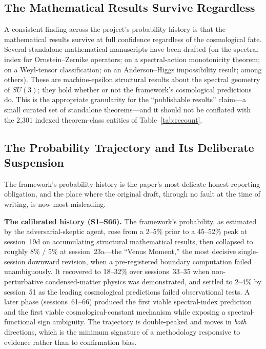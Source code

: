 \documentclass[12pt,a4paper]{article}
\begin{document}
\subsection{The Mathematical Results Survive Regardless}
\label{sec:math-survive}

A consistent finding across the project's probability history is that the mathematical results survive at full confidence regardless of the cosmological fate. Several standalone mathematical manuscripts have been drafted (on the spectral index for Ornstein--Zernike operators; on a spectral-action monotonicity theorem; on a Weyl-tensor classification; on an Anderson--Higgs impossibility result; among others). These are machine-epsilon structural results about the spectral geometry of $SU(3)$; they hold whether or not the framework's cosmological predictions do. This is the appropriate granularity for the ``publishable results'' claim---a small curated set of standalone theorems---and it should not be conflated with the 2{,}301 indexed theorem-class entities of Table~\ref{tab:recount}.

\subsection{The Probability Trajectory and Its Deliberate Suspension}
\label{sec:trajectory}

The framework's probability history is the paper's most delicate honest-reporting obligation, and the place where the original draft, through no fault at the time of writing, is now most misleading.

\textbf{The calibrated history (S1--S66).} The framework's probability, as estimated by the adversarial-skeptic agent, rose from a 2--5\% prior to a 45--52\% peak at session~19d on accumulating structural mathematical results, then collapsed to roughly 8\% / 5\% at session~23a---the ``Venus Moment,'' the most decisive single-session downward revision, when a pre-registered boundary computation failed unambiguously. It recovered to 18--32\% over sessions~33--35 when non-perturbative condensed-matter physics was demonstrated, and settled to 2--4\% by session~51 as the leading cosmological predictions failed observational tests. A later phase (sessions~61--66) produced the first viable spectral-index prediction and the first viable cosmological-constant mechanism while exposing a spectral-functional sign ambiguity. The trajectory is double-peaked and moves in \emph{both} directions, which is the minimum signature of a methodology responsive to evidence rather than to confirmation bias.
\end{document}
